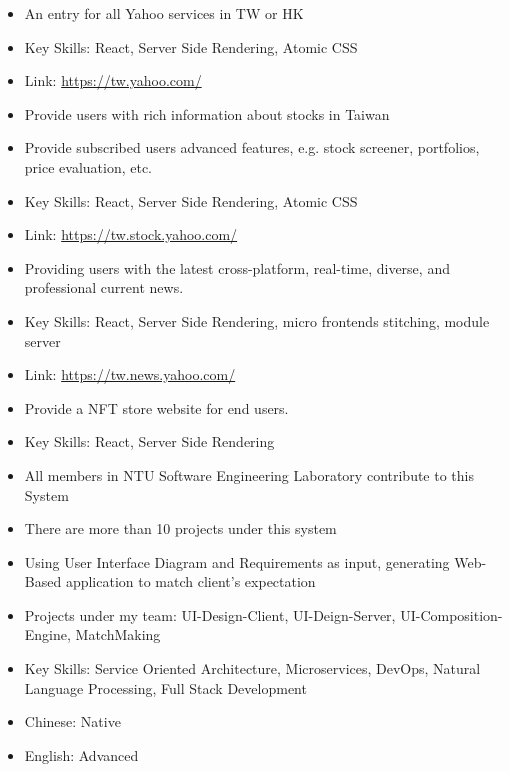 


\begin{itemize}
\item An entry for all Yahoo services in TW or HK
\item Key Skills: React, Server Side Rendering, Atomic CSS
\item Link: \url{https://tw.yahoo.com/}
\end{itemize}

\begin{itemize}
\item Provide users with rich information about stocks in Taiwan
\item Provide subscribed users advanced features, e.g. stock screener, portfolios, price evaluation, etc.
\item Key Skills: React, Server Side Rendering, Atomic CSS
\item Link: \url{https://tw.stock.yahoo.com/}
\end{itemize}

\begin{itemize}
\item Providing users with the latest cross-platform, real-time, diverse, and professional current news. 
\item Key Skills: React, Server Side Rendering, micro frontends stitching, module server
\item Link: \url{https://tw.news.yahoo.com/}
\end{itemize}

\begin{itemize}
\item Provide a NFT store website for end users. 
\item Key Skills: React, Server Side Rendering
\end{itemize}

\begin{itemize}
\item All members in NTU Software Engineering Laboratory contribute to this System
\item There are more than 10 projects under this system
\item Using User Interface Diagram and Requirements as input, generating Web-Based application to match client's expectation
\item Projects under my team: UI-Design-Client, UI-Deign-Server, UI-Composition-Engine, MatchMaking
\item Key Skills: Service Oriented Architecture, Microservices, DevOps, Natural Language Processing, Full Stack Development
\end{itemize}



\begin{itemize}
\item Chinese: Native
\item English: Advanced
\end{itemize}